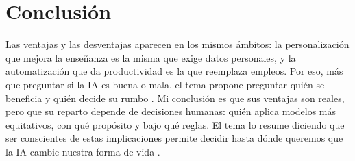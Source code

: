 \documentclass[11pt,letterpaper]{article}
\begin{document}
\section{Conclusión}

Las ventajas y las desventajas aparecen en los mismos ámbitos: la personalización que mejora la enseñanza es la misma que exige datos personales, y la automatización que da productividad es la que reemplaza empleos. Por eso, más que preguntar si la IA es buena o mala, el tema propone preguntar quién se beneficia y quién decide su rumbo \parencite{iae_u6_t62}. Mi conclusión es que sus ventajas son reales, pero que su reparto depende de decisiones humanas: quién aplica modelos más equitativos, con qué propósito y bajo qué reglas. El tema lo resume diciendo que ser conscientes de estas implicaciones permite decidir hasta dónde queremos que la IA cambie nuestra forma de vida \parencite{iae_u6_t62}.

\end{document}
